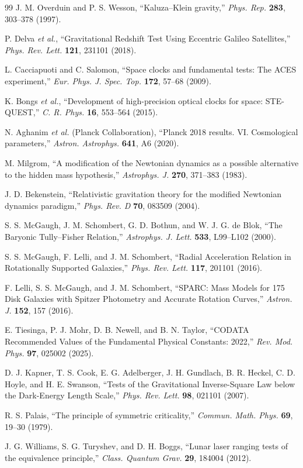 \documentclass[11pt,a4paper]{article}
\theoremstyle{definition}
\theoremstyle{remark}
\begin{document}
\begin{thebibliography}{99}
 J. M. Overduin and P. S. Wesson, ``Kaluza--Klein gravity,'' \textit{Phys. Rep.} \textbf{283}, 303--378 (1997).

 P. Delva \textit{et al.}, ``Gravitational Redshift Test Using Eccentric Galileo Satellites,'' \textit{Phys. Rev. Lett.} \textbf{121}, 231101 (2018).

 L. Cacciapuoti and C. Salomon, ``Space clocks and fundamental tests: The ACES experiment,'' \textit{Eur. Phys. J. Spec. Top.} \textbf{172}, 57--68 (2009).

 K. Bongs \textit{et al.}, ``Development of high-precision optical clocks for space: STE-QUEST,'' \textit{C. R. Phys.} \textbf{16}, 553--564 (2015).

 N. Aghanim \textit{et al.} (Planck Collaboration), ``Planck 2018 results. VI. Cosmological parameters,'' \textit{Astron. Astrophys.} \textbf{641}, A6 (2020).

 M. Milgrom, ``A modification of the Newtonian dynamics as a possible alternative to the hidden mass hypothesis,'' \textit{Astrophys. J.} \textbf{270}, 371--383 (1983).

 J. D. Bekenstein, ``Relativistic gravitation theory for the modified Newtonian dynamics paradigm,'' \textit{Phys. Rev. D} \textbf{70}, 083509 (2004).

 S. S. McGaugh, J. M. Schombert, G. D. Bothun, and W. J. G. de Blok, ``The Baryonic Tully--Fisher Relation,'' \textit{Astrophys. J. Lett.} \textbf{533}, L99--L102 (2000).

 S. S. McGaugh, F. Lelli, and J. M. Schombert, ``Radial Acceleration Relation in Rotationally Supported Galaxies,'' \textit{Phys. Rev. Lett.} \textbf{117}, 201101 (2016).

 F. Lelli, S. S. McGaugh, and J. M. Schombert, ``SPARC: Mass Models for 175 Disk Galaxies with Spitzer Photometry and Accurate Rotation Curves,'' \textit{Astron. J.} \textbf{152}, 157 (2016).

 E. Tiesinga, P. J. Mohr, D. B. Newell, and B. N. Taylor, ``CODATA Recommended Values of the Fundamental Physical Constants: 2022,'' \textit{Rev. Mod. Phys.} \textbf{97}, 025002 (2025).

 D. J. Kapner, T. S. Cook, E. G. Adelberger, J. H. Gundlach, B. R. Heckel, C. D. Hoyle, and H. E. Swanson, ``Tests of the Gravitational Inverse-Square Law below the Dark-Energy Length Scale,'' \textit{Phys. Rev. Lett.} \textbf{98}, 021101 (2007).

 R. S. Palais, ``The principle of symmetric criticality,'' \textit{Commun. Math. Phys.} \textbf{69}, 19--30 (1979).

 J. G. Williams, S. G. Turyshev, and D. H. Boggs, ``Lunar laser ranging tests of the equivalence principle,'' \textit{Class. Quantum Grav.} \textbf{29}, 184004 (2012).

\end{thebibliography}
\end{document}
